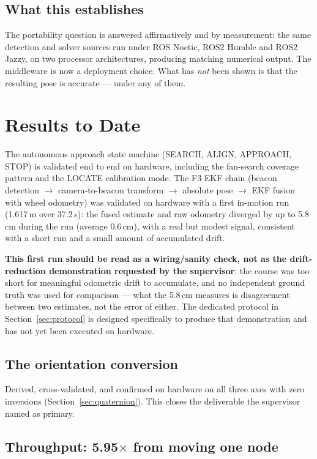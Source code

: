 \documentclass[11pt]{article}
\begin{document}
\subsection{What this establishes}

The portability question is answered affirmatively and by measurement: the
same detection and solver sources run under ROS Noetic, ROS2 Humble and ROS2
Jazzy, on two processor architectures, producing matching numerical output.
The middleware is now a deployment choice. What has \emph{not} been shown is
that the resulting pose is accurate --- under any of them.

\section{Results to Date}

The autonomous approach state machine (SEARCH, ALIGN, APPROACH, STOP) is
validated end to end on hardware, including the fan-search coverage pattern
and the LOCATE calibration mode. The F3 EKF chain (beacon detection $\to$
camera-to-beacon transform $\to$ absolute pose $\to$ EKF fusion with wheel
odometry) was validated on hardware with a first in-motion run (1.617\,m
over 37.2\,s): the fused estimate and raw odometry diverged by up to 5.8\,cm
during the run (average 0.6\,cm), with a real but modest signal, consistent
with a short run and a small amount of accumulated drift.

\textbf{This first run should be read as a wiring/sanity check, not as the
drift-reduction demonstration requested by the supervisor}: the course was
too short for meaningful odometric drift to accumulate, and no independent
ground truth was used for comparison --- what the 5.8\,cm measures is
disagreement between two estimates, not the error of either. The dedicated
protocol in Section~\ref{sec:protocol} is designed specifically to produce
that demonstration and has not yet been executed on hardware.

\subsection{The orientation conversion}

Derived, cross-validated, and confirmed on hardware on all three axes with
zero inversions (Section~\ref{sec:quaternion}). This closes the deliverable
the supervisor named as primary.

\subsection{Throughput: 5.95$\times$ from moving one node}
\label{sec:results-throughput}
\end{document}
